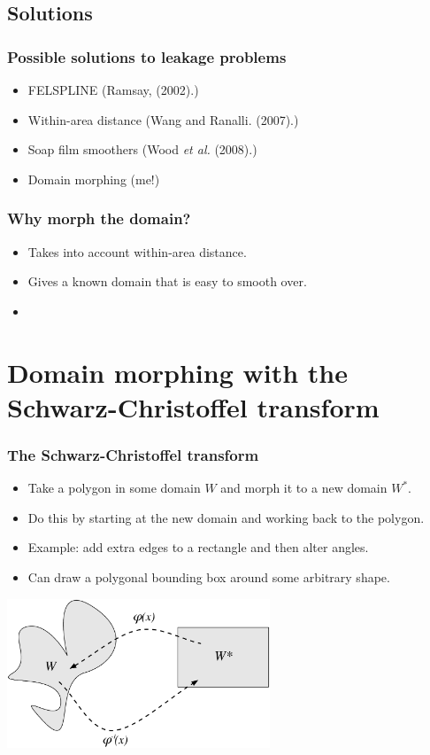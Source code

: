 \documentclass[ignorenonframetext]{beamer} %
\newcommand{\bc}{\begin{center}}
\newcommand{\ec}{\end{center}}
\newcommand{\bi}{\begin{itemize}}
\newcommand{\ei}{\end{itemize}}
\begin{document}
\subsection{Solutions}

\begin{frame}
	\frametitle{Possible solutions to leakage problems}
       \bi
         \item FELSPLINE (Ramsay, (2002).)
         \item Within-area distance (Wang and Ranalli. (2007).)
         \item Soap film smoothers (Wood \emph{et al.} (2008).) 
         \item Domain morphing (me!)
        \ei
\end{frame}

\begin{frame}
	\frametitle{Why morph the domain?}
       \bi
         \item Takes into account within-area distance.
         \item Gives a known domain that is easy to smooth over.
         \item  
        \ei
\end{frame}


\section{Domain morphing with the Schwarz-Christoffel transform}

\begin{frame}
	\frametitle{The Schwarz-Christoffel transform}
       \bi
         \item Take a polygon in some domain $W$ and morph it to a new domain $W^*$.
         \item Do this by starting at the new domain and working back to the polygon.
         \item Example: add extra edges to a rectangle and then alter angles.
         \item Can draw a polygonal bounding box around some arbitrary shape.
        \ei
        \bc
              \includegraphics[height=1.75in]{figs/mappingdia}
       \ec
\end{frame}
\end{document}
